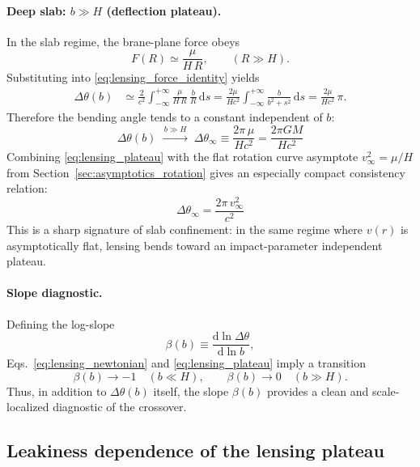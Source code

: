 \documentclass[11pt]{article}
\newcommand{\dd}{\mathrm{d}}
\begin{document}
\paragraph{Deep slab: $b\gg H$ (deflection plateau).}
In the slab regime, the brane-plane force obeys
\begin{equation}
  F(R)\simeq \frac{\mu}{H\,R},
  \qquad (R\gg H).
\end{equation}
Substituting into \eqref{eq:lensing_force_identity} yields
\begin{align}
  \Delta\theta(b)
  &\simeq \frac{2}{c^2}\int_{-\infty}^{+\infty}
  \frac{\mu}{H\,R}\,\frac{b}{R}\,\dd s
  = \frac{2\mu}{Hc^2}\int_{-\infty}^{+\infty}
  \frac{b}{b^2+s^2}\,\dd s
  = \frac{2\mu}{Hc^2}\,\pi.
\end{align}
Therefore the bending angle tends to a constant independent of $b$:
\begin{equation}
  \boxed{
  \Delta\theta(b)\;\xrightarrow{\,b\gg H\,}\;
  \Delta\theta_\infty
  \equiv \frac{2\pi\,\mu}{Hc^2}
  = \frac{2\pi GM}{Hc^2}
  }
  \label{eq:lensing_plateau}
\end{equation}
Combining \eqref{eq:lensing_plateau} with the flat rotation curve asymptote
$v_\infty^2=\mu/H$ from Section~\ref{sec:asymptotics_rotation} gives an especially compact
consistency relation:
\begin{equation}
  \boxed{
  \Delta\theta_\infty = \frac{2\pi\,v_\infty^2}{c^2}
  }
  \label{eq:lensing_rotation_relation}
\end{equation}
This is a sharp signature of slab confinement: in the same regime where $v(r)$ is asymptotically
flat, lensing bends toward an impact-parameter independent plateau.

\paragraph{Slope diagnostic.}
Defining the log-slope
\begin{equation}
  \beta(b)\equiv \frac{\dd\ln \Delta\theta}{\dd\ln b},
\end{equation}
Eqs.~\eqref{eq:lensing_newtonian} and \eqref{eq:lensing_plateau} imply a transition
\begin{equation}
  \beta(b)\to -1 \quad (b\ll H),
  \qquad
  \beta(b)\to 0 \quad (b\gg H).
\end{equation}
Thus, in addition to $\Delta\theta(b)$ itself, the slope $\beta(b)$ provides a clean and
scale-localized diagnostic of the crossover.

\subsection{Leakiness dependence of the lensing plateau}
\label{sec:lensing_leaky}
\end{document}
